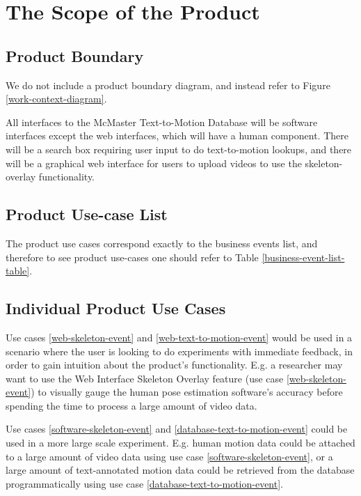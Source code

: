 \documentclass{scrreprt}
\begin{document}
\section{The Scope of the Product}

\subsection{Product Boundary}

We do not include a product boundary diagram, and instead refer to Figure
\ref{work-context-diagram}.

All interfaces to the McMaster Text-to-Motion Database will be software
interfaces except the web interfaces, which will have a human component. There
will be a search box requiring user input to do text-to-motion lookups, and
there will be a graphical web interface for users to upload videos to use the
skeleton-overlay functionality.

\subsection{Product Use-case List}

The product use cases correspond exactly to the business events list, and
therefore to see product use-cases one should refer to Table
\ref{business-event-list-table}.

\subsection{Individual Product Use Cases}

Use cases \ref{web-skeleton-event} and \ref{web-text-to-motion-event} would be
used in a scenario where the user is looking to do experiments with immediate
feedback, in order to gain intuition about the product's functionality. E.g. a
researcher may want to use the Web Interface Skeleton Overlay feature (use case
\ref{web-skeleton-event}) to visually gauge the human pose estimation
software's accuracy before spending the time to process a large amount of video
data.

Use cases \ref{software-skeleton-event} and \ref{database-text-to-motion-event}
could be used in a more large scale experiment. E.g. human motion data could be
attached to a large amount of video data using use case
\ref{software-skeleton-event}, or a large amount of text-annotated motion data
could be retrieved from the database programmatically using use case
\ref{database-text-to-motion-event}.
\end{document}
